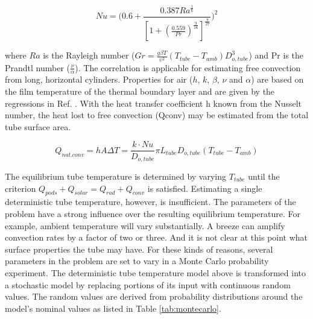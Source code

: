 \documentclass[heading.tex]{subfiles}
\begin{document}

\begin{equation}
Nu = \Bigg(0.6 + \frac{0.387Ra^{\frac{1}{6}}}{[1+(\frac{0.559}{Pr})^{\frac{9}{16}}]^{\frac{8}{27}}}\Bigg)^2
\end{equation}

where $Ra$ is the Rayleigh number
($Gr = \frac{g \beta T} {\upsilon^2}  (T_{tube}-T_{amb}) {D}_{o,tube}^3$)
and Pr is the Prandtl number ($\frac{\nu}{\alpha}$).
The correlation is applicable for estimating free convection from long,
horizontal cylinders. Properties for air ($h$, $k$, $\beta$, $\nu$ and $\alpha$)
are based on the film temperature of the thermal boundary layer
and are given by the regressions in Ref. \cite{Clausing}.
With the heat transfer coefficient h known from the Nusselt number,
the heat lost to free convection (Qconv) may be estimated from the total tube surface area.

\begin{equation}
Q_{nat. conv} = hA \Delta T = \frac{k\cdot Nu}{ {D}_{o,tube}} \pi {L}_{tube} {D}_{o,tube} (T_{tube}-T_{amb})
\end{equation}


The equilibrium tube temperature is determined by varying $T_{tube}$ until the criterion
$Q_{pods} + Q_{solar} = Q_{rad} + Q_{conv}$ is satisfied.
Estimating a single deterministic tube temperature, however, is insufficient.
The parameters of the problem have a strong influence over the resulting equilibrium
temperature. For example, ambient temperature will vary substantially.
A breeze can amplify convection rates by a factor of two or three.
And it is not clear at this point what surface properties the tube may have.
For these kinds of reasons, several parameters in the problem are set to vary in 
a Monte Carlo probability experiment.
The deterministic tube temperature model above is transformed into a stochastic model by
replacing portions of its input with continuous random values.
The random values are derived from probability distributions
around the model’s nominal values as listed in Table \ref{tab:montecarlo}.
\end{document}
